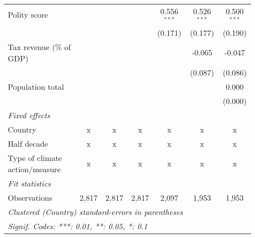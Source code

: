 \begin{tabular}{lcccccc}
   Polity score                                                         &              &              &                & 0.556$^{***}$  & 0.526$^{***}$  & 0.500$^{***}$\\   
                                                                        &              &              &                & (0.171)        & (0.177)        & (0.190)\\   
   Tax revenue (\% of GDP)                                              &              &              &                &                & -0.065         & -0.047\\   
                                                                        &              &              &                &                & (0.087)        & (0.086)\\   
   Population total                                                     &              &              &                &                &                & 0.000\\   
                                                                        &              &              &                &                &                & (0.000)\\   
   \emph{Fixed effects}\\
   Country                                                              & x            & x            & x              & x              & x              & x\\  
   Half decade                                                          & x            & x            & x              & x              & x              & x\\  
   Type of climate action/measure                                       & x            & x            & x              & x              & x              & x\\  
   \midrule \emph{Fit statistics}\\
   Observations                                                         & 2,817        & 2,817        & 2,817          & 2,097          & 1,953          & 1,953\\  
   \midrule
   \multicolumn{7}{l}{\emph{Clustered (Country) standard-errors in parentheses}}\\
   \multicolumn{7}{l}{\emph{Signif. Codes: ***: 0.01, **: 0.05, *: 0.1}}\\
\end{tabular}
\par\endgroup


